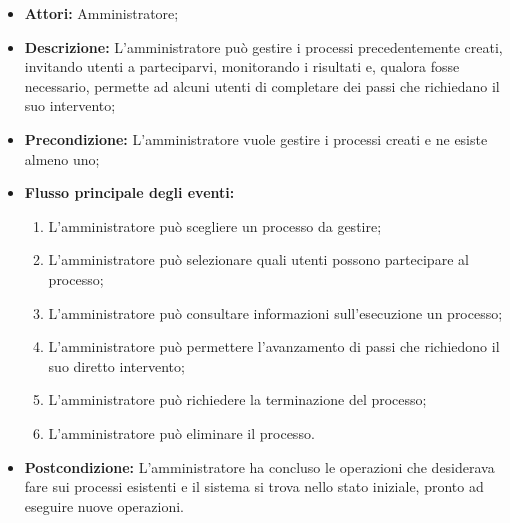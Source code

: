 \begin{itemize}
\item \textbf{Attori:}
Amministratore;
\item \textbf{Descrizione:}
L'amministratore può gestire i processi precedentemente creati, invitando utenti a parteciparvi, monitorando i risultati e, qualora fosse necessario, permette ad alcuni utenti di completare dei passi che richiedano il suo intervento;
\item \textbf{Precondizione:}
L'amministratore vuole gestire i processi creati e ne esiste almeno uno;
\item \textbf{Flusso principale degli eventi:}
\begin{enumerate}
\item L'amministratore può scegliere un processo da gestire;
\item L'amministratore può selezionare quali utenti possono partecipare al processo;
\item L'amministratore può consultare informazioni sull'esecuzione un processo;
\item L'amministratore può permettere l'avanzamento di passi che richiedono il suo diretto intervento;
\item L'amministratore può richiedere la terminazione del processo;
\item L'amministratore può eliminare il processo.
\end{enumerate}
\item \textbf{Postcondizione:}
L'amministratore ha concluso le operazioni che desiderava fare sui processi esistenti e il sistema si trova nello stato iniziale, pronto ad eseguire nuove operazioni.
\end{itemize}

\hypertarget{A2.1}{}
